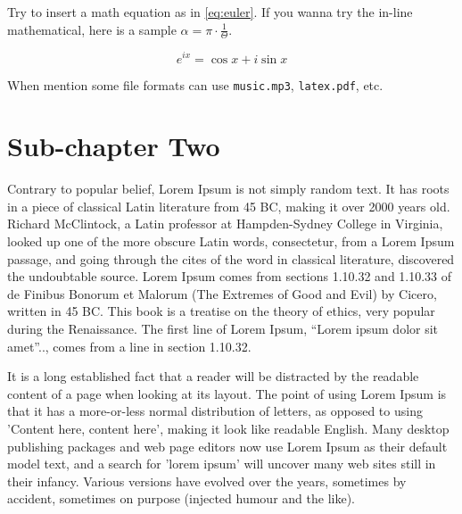 \begin{spacing}{2.0}
Try to insert a math equation as in \autoref{eq:euler}. If you wanna try the in-line mathematical, here is a sample $\alpha = \pi \cdot \frac{1}{\Theta}$.

\begin{equation}
\label{eq:euler}
    e^{ix}= \cos{x} + i \sin{x}
\end{equation}


When mention some file formats can use \texttt{music.mp3}, \texttt{latex.pdf}, etc.




\section{Sub-chapter Two}

Contrary to popular belief, Lorem Ipsum is not simply random text. It has roots in a piece of 
classical Latin literature from 45 BC, making it over 2000 years old. Richard McClintock, a Latin professor at Hampden-Sydney College in Virginia, looked up one of the more obscure Latin words, consectetur, from a Lorem Ipsum passage, and going through the cites of the word in classical literature, discovered the undoubtable source. Lorem Ipsum comes from sections 1.10.32 and 1.10.33 of de Finibus Bonorum et Malorum (The Extremes of Good and Evil) by Cicero, written in 45 BC. This book is a treatise on the theory of ethics, very popular during the Renaissance. The first line of Lorem Ipsum, \enquote{Lorem ipsum dolor sit amet}.., comes from a line in section 1.10.32.

It is a long established fact that a reader will be distracted by the readable content of a page when looking at its layout. The point of using Lorem Ipsum is that it has a more-or-less normal distribution of letters, as opposed to using 'Content here, content here', making it look like readable English. Many desktop publishing packages and web page editors now use Lorem Ipsum as their default model text, and a search for 'lorem ipsum' will uncover many web sites still in their infancy. Various versions have evolved over the years, sometimes by accident, sometimes on purpose (injected humour and the like).


\end{spacing}
